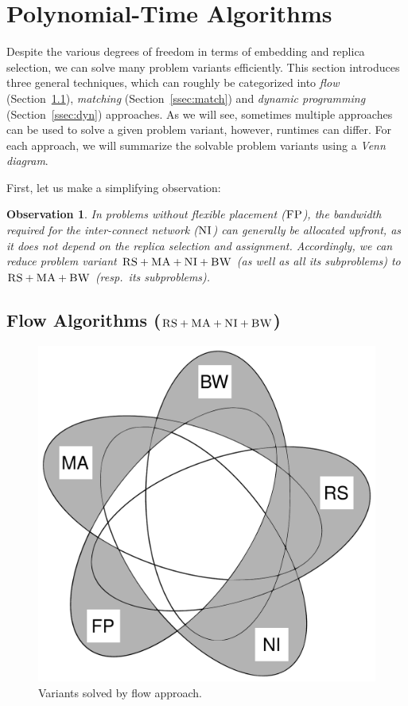 \documentclass[9pt]{sigcomm-alternate}
\newcommand{\CC}{\textsc{NI}}
\newcommand{\FP}{\textsc{FP}}
\newcommand{\RS}{\textsc{RS}}
\newcommand{\BW}{\textsc{BW}}
\newcommand{\MA}{\textsc{MA}}
\newtheorem{obs}{Observation}
\begin{document}
\section{Polynomial-Time Algorithms}\label{sec:poly}


Despite the various degrees of freedom in terms of embedding and replica selection,
we can solve many problem variants efficiently.
 This section introduces three general techniques,
 which can roughly be categorized into
 \emph{flow} (Section~\ref{ssec:flow}), \emph{matching} (Section~\ref{ssec:match}) and \emph{dynamic programming}
 (Section~\ref{ssec:dyn}) approaches.
 As we will see, sometimes multiple approaches can be used to solve a given problem variant, however,
 runtimes can differ.
For each approach, we will summarize the solvable problem variants using a \emph{Venn diagram}.

First, let us make a simplifying observation:
\begin{obs}\label{obs:nofp}
In problems without flexible placement ($\FP$),
the bandwidth required
for the inter-connect network ($\CC$) can generally be allocated \emph{upfront}, as it
does not depend on the replica
selection and assignment.
Accordingly, we can reduce problem variant $\RS+\MA+\CC +\BW$ (as well as all its subproblems)
to $\RS+\MA+\BW$ (resp.~its subproblems).

\end{obs}

\subsection{Flow Algorithms ($\RS+\MA+\CC+\BW$)}\label{ssec:flow}

\begin{figure}
\includegraphics[width=0.48\columnwidth]{figs/venn_flow.pdf}
\caption{Variants solved by flow approach.}
\label{fig:venn_flow}
\end{figure}
\end{document}
